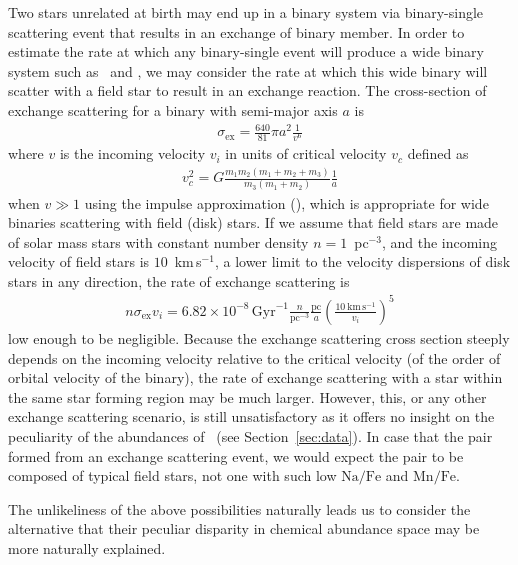 \documentclass[modern, letterpaper]{aastex61}
\newcommand{\sectionname}{Section}
\newcommand*\elem[1]{\ensuremath{\mathrm{#1}}}
\newcommand{\sunanalog}{\text{Krios}}
\newcommand{\bizarreone}{\text{Kronos}}
\begin{document}
Two stars unrelated at birth may end up in a binary system via binary-single scattering event
that results in an exchange of binary member.
In order to estimate the rate at which any binary-single
event will produce a wide binary system such as \sunanalog\ and \bizarreone,
we may consider the rate at which this wide binary will scatter with a field star to
result in an exchange reaction.
The cross-section of exchange scattering for a binary with semi-major axis $a$ is
\begin{eqnarray}
  \sigma_\mathrm{ex} = \frac{640}{81} \pi a^{2} \frac{1}{v^6}
\end{eqnarray}
where $v$ is the incoming velocity $v_i$ in units of critical velocity $v_c$ defined as
\begin{eqnarray}
  v_c^2 = G \frac{m_1 m_2 (m_1 + m_2 + m_3)}{m_3 (m_1 + m_2)} \frac{1}{a}
\end{eqnarray}
when $v \gg 1$ using the impulse approximation (\citealt{Hut:1983aa,Hut:1983ab}),
which is appropriate for wide binaries scattering with field (disk) stars.
If we assume that field stars are made of solar mass stars
with constant number density $n=1$~pc$^{-3}$, and the incoming velocity of field stars
is $10$~km\,s$^{-1}$, a lower limit to the velocity dispersions of disk
stars in any direction, the rate of exchange scattering is
\begin{eqnarray}
  n \sigma_\mathrm{ex} v_i = 6.82\times 10^{-8}\,\mathrm{Gyr}^{-1}
  \frac{n}{\mathrm{pc}^{-3}} \frac{\mathrm{pc}}{a} \left(\frac{10~\mathrm{km}\,\mathrm{s}^{-1}}{v_i}\right)^5
\end{eqnarray}
low enough to be negligible.
Because the exchange scattering cross section steeply depends on the incoming velocity
relative to the critical velocity (of the order of orbital velocity of the binary),
the rate of exchange scattering with a star within the same star forming region
may be much larger.
However, this, or any other exchange scattering scenario,
is still unsatisfactory as it offers no insight on the
peculiarity of the abundances of \bizarreone\ (see
\sectionname~{\ref{sec:data}}).
In case that the pair formed from an exchange scattering event,
we would expect the pair to be composed of typical field stars,
not one with such low $\elem{Na}/\elem{Fe}$ and $\elem{Mn}/\elem{Fe}$.


The unlikeliness of the above possibilities naturally leads us to consider the
alternative that their peculiar disparity in chemical abundance space may be
more naturally explained.
\end{document}
